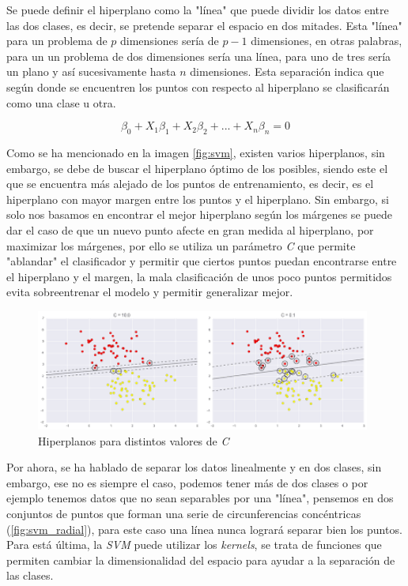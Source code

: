 Se puede definir el hiperplano como la "línea" que puede dividir los datos entre las dos clases, es decir, se pretende separar el espacio en dos mitades. Esta "línea" para un problema de \(p\) dimensiones sería de \(p-1\) dimensiones, en otras palabras, para un un problema de dos dimensiones sería una línea, para uno de tres sería un plano y así sucesivamente hasta \(n\) dimensiones. Esta separación indica que según donde se encuentren los puntos con respecto al hiperplano se clasificarán como una clase u otra.

\begin{equation}
    \beta_0 + X_1\beta_1 + X_2\beta_2 +  ... +  X_n\beta_n = 0 
\end{equation}

Como se ha mencionado en la imagen \ref{fig:svm}, existen varios hiperplanos, sin embargo, se debe de buscar el hiperplano óptimo de los posibles, siendo este el que se encuentra más alejado de los puntos de entrenamiento, es decir, es el hiperplano con mayor margen entre los puntos y el hiperplano. Sin embargo, si solo nos basamos en encontrar el mejor hiperplano según los márgenes se puede dar el caso de que un nuevo punto afecte en gran medida al hiperplano, por maximizar los márgenes, por ello se utiliza un parámetro \textit{C} que permite "ablandar" el clasificador y permitir que ciertos puntos puedan encontrarse entre el hiperplano y el margen, la mala clasificación de unos poco puntos permitidos evita sobreentrenar el modelo y permitir generalizar mejor.

\begin{figure}[H]
    \centering
    \includegraphics[width=11cm]{figs/svm_c.png}
    \caption{Hiperplanos para distintos valores de \textit{C}}
    \label{fig:svm_c}
\end{figure}

Por ahora, se ha hablado de separar los datos linealmente y en dos clases, sin embargo, ese no es siempre el caso, podemos tener más de dos clases o por ejemplo tenemos datos que no sean separables por una "línea", pensemos en dos conjuntos de puntos que forman una serie de circunferencias concéntricas (\ref{fig:svm_radial}), para este caso una línea nunca logrará separar bien los puntos. Para está última, la \textit{SVM} puede utilizar los \textit{kernels}, se trata de funciones que permiten cambiar la dimensionalidad del espacio para ayudar a la separación de las clases.

